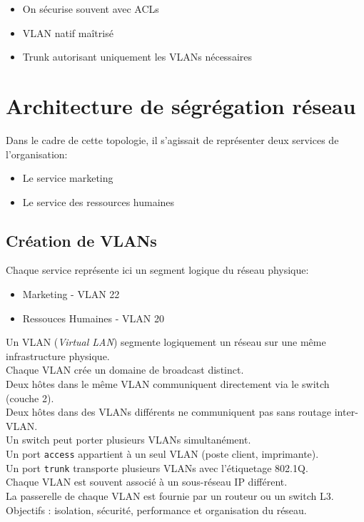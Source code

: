 \documentclass[a4paper,twoside,11pt]{article}
\begin{document}
\begin{profbox}[title=Améliorations à apporter]

  \begin{itemize}
      \item On sécurise souvent avec ACLs
      \item VLAN natif maîtrisé
      \item Trunk autorisant uniquement les VLANs nécessaires
  \end{itemize}

\end{profbox}



\section{Architecture de ségrégation réseau}

Dans le cadre de cette topologie, il s'agissait de représenter deux services de l'organisation:
\begin{itemize}
  \item Le service marketing 
  \item Le service des ressources humaines 
\end{itemize}
\bigskip 

\subsection{Création de VLANs}

Chaque service représente ici un segment logique du réseau physique:
\begin{itemize}
  \item Marketing - VLAN 22
  \item Ressouces Humaines - VLAN 20
\end{itemize}

\begin{definitionbox}[title=Définition d'un VLAN]
Un VLAN (\textit{Virtual LAN}) segmente logiquement un réseau sur une même infrastructure physique.\\
Chaque VLAN crée un domaine de broadcast distinct.\\
Deux hôtes dans le même VLAN communiquent directement via le switch (couche 2).\\
Deux hôtes dans des VLANs différents ne communiquent pas sans routage inter-VLAN.\\
Un switch peut porter plusieurs VLANs simultanément.\\
Un port \texttt{access} appartient à un seul VLAN (poste client, imprimante).\\
Un port \texttt{trunk} transporte plusieurs VLANs avec l’étiquetage 802.1Q.\\
Chaque VLAN est souvent associé à un sous-réseau IP différent.\\
La passerelle de chaque VLAN est fournie par un routeur ou un switch L3.\\
Objectifs : isolation, sécurité, performance et organisation du réseau.

\end{definitionbox}
\end{document}
